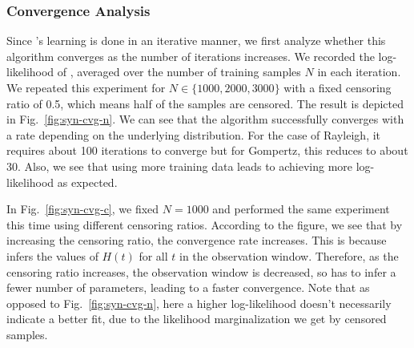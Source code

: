 \subsubsection{Convergence Analysis}
Since \npglm's learning is done in an iterative manner, we first analyze whether this algorithm converges as the number of iterations increases. We recorded the log-likelihood of \npglm, averaged over the number of training samples $N$ in each iteration. We repeated this experiment for $N\in\{1000,2000,3000\}$ with a fixed censoring ratio of 0.5, which means half of the samples are censored. The result is depicted in Fig.~\ref{fig:syn-cvg-n}. We can see that the algorithm successfully converges with a rate depending on the underlying distribution. For the case of Rayleigh, it requires about 100 iterations to converge but for Gompertz, this reduces to about 30. Also, we see that using more training data leads to achieving more log-likelihood as expected.



In Fig.~\ref{fig:syn-cvg-c}, we fixed $N=1000$ and performed the same experiment this time using different censoring ratios. According to the figure, we see that by increasing the censoring ratio, the convergence rate increases. This is because \npglm infers the values of $H(t)$ for all $t$ in the observation window. Therefore, as the censoring ratio increases, the observation window is decreased, so \npglm has to infer a fewer number of parameters, leading to a faster convergence. Note that as opposed to Fig.~\ref{fig:syn-cvg-n}, here a higher log-likelihood doesn't necessarily indicate a better fit, due to the likelihood marginalization we get by censored samples.


